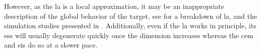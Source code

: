 However, as the \gls{la} is a local approximation, it may be an inappropriate description of the global behavior of the target, see  for a breakdown of \gls{la}, and the simulation studies presented in . 
Additionally, even if the \gls{la} works in principle, its \gls{ess} will usually degenerate quickly once the dimension increases whereas the \gls{cem} and \gls{eis} do so at a slower pace.

%


